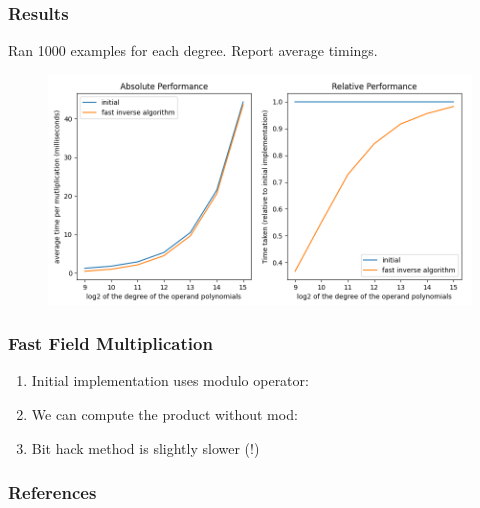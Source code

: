 \documentclass{beamer}
\begin{document}
\begin{frame}
    \frametitle{Results}
    
    Ran 1000 examples for each degree. Report average timings.

    \begin{figure}
        \includegraphics[width=\textwidth]{fastinv.png}
    \end{figure}
\end{frame}

\begin{frame}
    \frametitle{Fast Field Multiplication}

    \begin{enumerate}[label=(\roman*)]
        \item Initial implementation uses modulo operator:
             \pause \smallbreak
        \item We can compute the product without mod:
             \pause \smallbreak
        \item Bit hack method is slightly slower (!)
    \end{enumerate}
\end{frame}

\begin{frame}
    \frametitle{References}

    
    
\end{frame}
\end{document}
